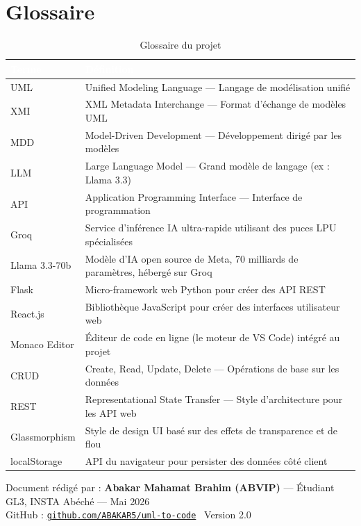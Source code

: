 \documentclass[12pt,a4paper]{article}
\begin{document}
\section{Glossaire}

\begin{table}[H]
\centering
\renewcommand{\arraystretch}{1.3}
\begin{tabularx}{\textwidth}{|l|X|}
\hline
\rowcolor{darkblue!90}
\textcolor{white}{\textbf{Terme}} &
\textcolor{white}{\textbf{Définition}} \\
\hline
UML & Unified Modeling Language — Langage de modélisation unifié \\
\hline
\rowcolor{lightgray}
XMI & XML Metadata Interchange — Format d'échange de modèles UML \\
\hline
MDD & Model-Driven Development — Développement dirigé par les modèles \\
\hline
\rowcolor{lightgray}
LLM & Large Language Model — Grand modèle de langage (ex : Llama 3.3) \\
\hline
API & Application Programming Interface — Interface de programmation \\
\hline
\rowcolor{lightgray}
Groq & Service d'inférence IA ultra-rapide utilisant des puces LPU spécialisées \\
\hline
Llama 3.3-70b & Modèle d'IA open source de Meta, 70 milliards de paramètres, hébergé sur Groq \\
\hline
\rowcolor{lightgray}
Flask & Micro-framework web Python pour créer des API REST \\
\hline
React.js & Bibliothèque JavaScript pour créer des interfaces utilisateur web \\
\hline
\rowcolor{lightgray}
Monaco Editor & Éditeur de code en ligne (le moteur de VS Code) intégré au projet \\
\hline
CRUD & Create, Read, Update, Delete — Opérations de base sur les données \\
\hline
\rowcolor{lightgray}
REST & Representational State Transfer — Style d'architecture pour les API web \\
\hline
Glassmorphism & Style de design UI basé sur des effets de transparence et de flou \\
\hline
\rowcolor{lightgray}
localStorage & API du navigateur pour persister des données côté client \\
\hline
\end{tabularx}
\caption{Glossaire du projet}
\end{table}

\vfill
\begin{center}
  {\small\color{textmuted}
    Document rédigé par : \textbf{Abakar Mahamat Brahim (ABVIP)} — Étudiant GL3, INSTA Abéché — Mai 2026\\
    GitHub : \href{https://github.com/ABAKAR5/uml-to-code}{\texttt{github.com/ABAKAR5/uml-to-code}} \textbar\ Version 2.0
  }
\end{center}
\end{document}
